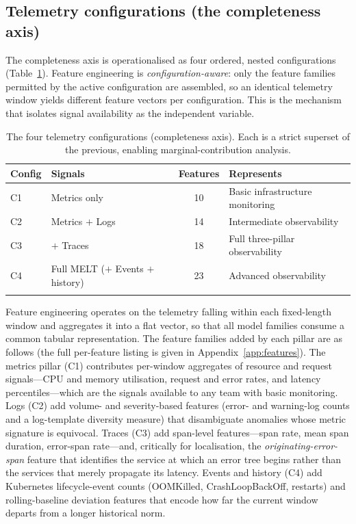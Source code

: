 \documentclass[pdflatex,sn-mathphys-num]{sn-jnl}%
\theoremstyle{thmstyleone}%
\theoremstyle{thmstyletwo}%
\theoremstyle{thmstylethree}%
\begin{document}
\subsection{Telemetry configurations (the completeness axis)}\label{sec:method-configs}

The completeness axis is operationalised as four ordered, nested configurations (Table~\ref{tab:configs}). Feature engineering is \emph{configuration-aware}: only the feature families permitted by the active configuration are assembled, so an identical telemetry window yields different feature vectors per configuration. This is the mechanism that isolates signal availability as the independent variable.

\begin{table}[t]
\caption{The four telemetry configurations (completeness axis). Each is a strict superset of the previous, enabling marginal-contribution analysis.}\label{tab:configs}
\begin{tabular}{@{}llcl@{}}
\toprule
Config & Signals & Features & Represents \\
\midrule
C1 & Metrics only        & 10 & Basic infrastructure monitoring \\
C2 & Metrics ${+}$ Logs  & 14 & Intermediate observability \\
C3 & ${+}$ Traces        & 18 & Full three-pillar observability \\
C4 & Full MELT (${+}$ Events ${+}$ history) & 23 & Advanced observability \\
\botrule
\end{tabular}
\end{table}

Feature engineering operates on the telemetry falling within each fixed-length window and aggregates it into a flat vector, so that all model families consume a common tabular representation. The feature families added by each pillar are as follows (the full per-feature listing is given in Appendix~\ref{app:features}). The metrics pillar (C1) contributes per-window aggregates of resource and request signals---CPU and memory utilisation, request and error rates, and latency percentiles---which are the signals available to any team with basic monitoring. Logs (C2) add volume- and severity-based features (error- and warning-log counts and a log-template diversity measure) that disambiguate anomalies whose metric signature is equivocal. Traces (C3) add span-level features---span rate, mean span duration, error-span rate---and, critically for localisation, the \emph{originating-error-span} feature that identifies the service at which an error tree begins rather than the services that merely propagate its latency. Events and history (C4) add Kubernetes lifecycle-event counts (OOMKilled, CrashLoopBackOff, restarts) and rolling-baseline deviation features that encode how far the current window departs from a longer historical norm.
\end{document}
